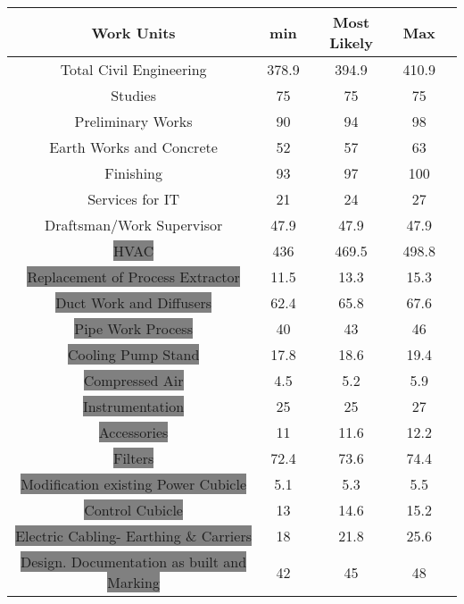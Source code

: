 \begin{table}[ht]
	
\begin{center}
	\begin{tabular}{ |c|c|c|c|c|} 
		\hline
		\hline
		
		Work Units 													& min & Most  Likely&Max\\
		\hline
		\colorbox{Melon}{Total Civil Engineering}	&378.9 &394.9&410.9\\ 
		\hline
		\colorbox{Melon}{Studies}							&75&75&75\\ 
		\hline
		\colorbox{Melon}{Preliminary Works}			&90&94&98\\ 
		\hline
		\colorbox{Melon}{Earth Works and Concrete}	&52 &57&63\\
		\hline
		\colorbox{Melon}{Finishing}							&93&97&100\\ 
		\hline
		\colorbox{Melon}{Services for IT}				&21&24&27\\
		\hline
		\colorbox{Melon}{Draftsman/Work Supervisor}		&47.9&47.9&47.9\\
		\hline
		\colorbox{Gray}{HVAC}								&436 &469.5& 498.8\\
		\hline
		\colorbox{Gray}{Replacement of Process Extractor}	&11.5& 13.3&15.3\\
		\hline
		\colorbox{Gray}{Duct Work and Diffusers}		&62.4&65.8&67.6\\
		\hline
		\colorbox{Gray}{Pipe Work Process}		&40& 43&46\\
		\hline
		\colorbox{Gray}{Cooling Pump Stand}	&17.8&18.6&19.4\\
		\hline
		\colorbox{Gray}{Compressed Air}			&4.5&5.2&5.9\\
		\hline
		\colorbox{Gray}{Instrumentation}		&25&25&27\\
		\hline
		\colorbox{Gray}{Accessories}			&11&11.6&12.2\\
		\hline
		\colorbox{Gray}{Filters}					&72.4&73.6&74.4\\
		\hline
		\colorbox{Gray}{Modification existing Power Cubicle}	&5.1  & 		5.3			&5.5\\
		\hline
		\colorbox{Gray}{Control Cubicle}		&13   							& 		14.6			&15.2\\
		\hline
		\colorbox{Gray}{Electric Cabling- Earthing \& Carriers}	&18 			& 	21.8				&25.6\\
		\hline
		\colorbox{Gray}{Design. Documentation as built and Marking}	&42  			& 		45			&48\\

\end{tabular}
\end{center}
\end{table}
